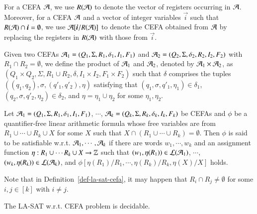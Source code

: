 \documentclass{llncs}
\begin{document}
For a CEFA $\mathcal{A}$, we use $R(\mathcal{A})$ to denote the vector of registers occurring in $\mathcal{A}$. Moreover, for a CEFA $\mathcal{A}$ and a vector of integer variables $\vec{i}$ such that $R(\Aut) \cap \vec{i} = \emptyset$, we use $\Aut[\vec{i}/R(\Aut)]$ to denote the CEFA obtained from $\mathcal{A}$ by replacing the registers in $R(\mathcal{A})$ with those from $\vec{i}$. 


Given two CEFAs $\mathcal{A}_1 = ( Q_1, \Sigma, R_1, \delta_1, I_1, F_1)$ and $\mathcal{A}_2 = (Q_2, \Sigma, \delta_2, R_2, I_2, F_2)$ with $R_1 \cap R_2 = \emptyset$, we define the product of $\mathcal{A}_1$ and $\mathcal{A}_2$, denoted by $\mathcal{A}_1 \times \mathcal{A}_2$, as $(Q_1 \times Q_2, \Sigma, R_1 \cup R_2, \delta, I_1 \times I_2, F_1 \times F_2)$ such that $\delta$ comprises the tuples $((q_1, q_2), \sigma, (q'_1, q'_2), \eta)$ satisfying that $(q_1, \sigma, q'_1, \eta_1) \in \delta_1$, $(q_2, \sigma, q'_2, \eta_2) \in \delta_2$, and $\eta = \eta_1\cup \eta_2$ for some $\eta_1, \eta_2$.


\begin{definition}\label{def-la-sat-cefa}
Let $\mathcal{A}_1=(Q_1, \Sigma, R_1, \delta_1, I_1, F_1)$, $\cdots$, $\mathcal{A}_k=(Q_k, \Sigma, R_k, \delta_k, I_k, F_k)$ be CEFAs
  and $\phi$ be a quantifier-free linear arithmetic formula whose free variables are from  $R_1 \cup \cdots \cup R_k \cup X$ for some $X$ such that $X \cap (R_1 \cup \cdots \cup R_k) = \emptyset$. Then $\phi$ is said to be satisfiable w.r.t. $\mathcal{A}_1, \cdots, \mathcal{A}_k$ if  there are words $w_1, \cdots, w_k$ and an assignment function $\eta: R_1 \cup \cdots R_k \cup X \rightarrow \mathbb{Z}$  %
 such that  $(w_1, \eta(R_1)) \in \mathcal{L}(\mathcal{A}_1)$, $ \cdots$, $(w_k, \eta(R_k)) \in \mathcal{L}(\mathcal{A}_k)$, and $\phi[\eta(R_1)/R_1, \cdots,\eta(R_k)/R_k, \eta(X)/X]$ holds.
\end{definition}
Note that in Definition~\ref{def-la-sat-cefa}, it may happen that $R_i \cap R_j \neq \emptyset$ for some $i, j \in [k]$ with $i \neq j$.

\begin{theorem}\label{thm-incra-la-sat}
The LA-SAT w.r.t. CEFA problem is decidable.
\end{theorem}
\end{document}
